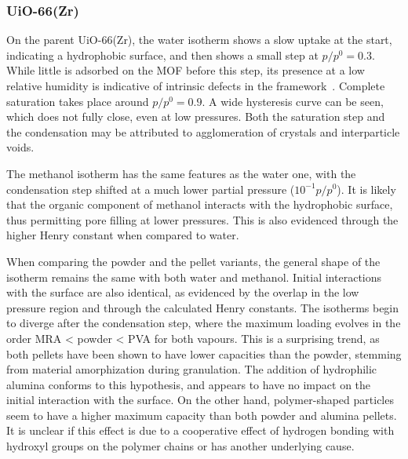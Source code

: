 \subsubsection{UiO-66(Zr)}

On the parent UiO-66(Zr), the water isotherm shows a slow uptake 
at the start, indicating a hydrophobic surface, and then shows 
a small step at \(p/p^0 = 0.3\). While little is 
adsorbed on the MOF before this step, its presence 
at a low relative humidity is indicative of intrinsic defects
in the framework~\cite{ghoshWaterAdsorptionUiO662014}.
Complete saturation takes place around \(p/p^0 = 0.9\). 
A wide hysteresis curve can be seen, which 
does not fully close, even at low pressures. Both the
saturation step and the condensation may be attributed 
to agglomeration of crystals and interparticle voids.

The methanol isotherm has the same features as the water
one, with the condensation step shifted at a much lower 
partial pressure (\(10^{-1} p/p^0\)). It is likely that
the organic component of methanol interacts with the
hydrophobic surface, thus permitting pore filling at
lower pressures. This is also evidenced through the higher
Henry constant when compared to water.

When comparing the powder and the pellet variants, the 
general shape of the isotherm remains the same with both
water and methanol. Initial interactions with the surface are also
identical, as evidenced by the overlap in the low pressure region
and through the calculated Henry constants. The isotherms 
begin to diverge after the condensation step, where the 
maximum loading evolves in the order MRA < powder < PVA
for both vapours. This is a surprising trend, as both pellets
have been shown to have lower capacities than the powder,
stemming from material amorphization during granulation.
The addition of hydrophilic alumina conforms to this hypothesis,
and appears to have no impact on the initial interaction with 
the surface. On the other hand, polymer-shaped particles
seem to have a higher maximum capacity than both powder and 
alumina pellets. It is unclear if this effect is due to a 
cooperative effect of hydrogen bonding with hydroxyl groups 
on the polymer chains or has another underlying cause.




